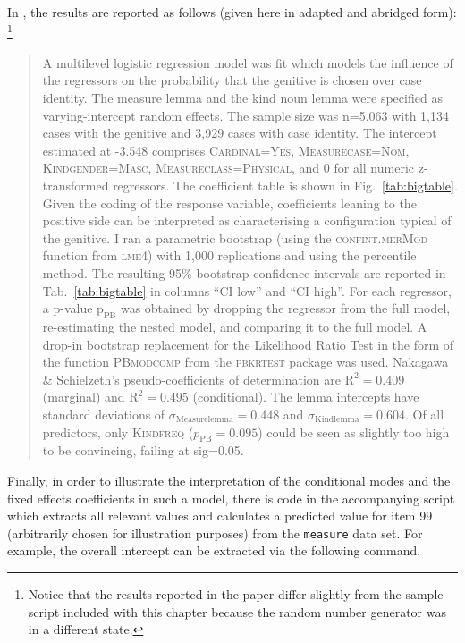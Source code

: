 In \citet{Schaefer2018}, the results are reported as follows (given here in adapted and abridged form):%
\footnote{Notice that the results reported in the paper differ slightly from the sample script included with this chapter because the random number generator was in a different state.}

\begin{quote}
  A multilevel logistic regression model was fit which models the influence of the regressors on the probability that the genitive is chosen over case identity.
  The measure lemma and the kind noun lemma were specified as varying-intercept random effects.
  The sample size was n=5,063 with 1,134 cases with the genitive and 3,929 cases with case identity.
  The intercept estimated at -3.548 comprises \textsc{Cardinal=Yes}, \textsc{Measurecase=Nom}, \textsc{Kindgender=Masc}, \textsc{Measureclass=Physical}, and 0 for all numeric z-transformed regressors.
  The coefficient table is shown in Fig.~\ref{tab:bigtable}.
  Given the coding of the response variable, coefficients leaning to the positive side can be interpreted as characterising a configuration typical of the genitive.
  I ran a parametric bootstrap (using the \mbox{\textsc{confint.merMod}} function from \textsc{lme4}) with 1,000 replications and using the percentile method.
  The resulting 95\% bootstrap confidence intervals are reported in Tab.~\ref{tab:bigtable} in columns ``CI low'' and ``CI high''.
  For each regressor, a p-value $\text{p}_{\text{PB}}$ was obtained by dropping the regressor from the full model, re-estimating the nested model, and comparing it to the full model.
  A drop-in bootstrap replacement for the Likelihood Ratio Test in the form of the function \textsc{PBmodcomp} from the \textsc{pbkrtest} package \citep{HalekohHojsgaard2014} was used. 
  Nakagawa \& Schielzeth's pseudo-coefficients of determination are $\textrm{R}^{\textrm{2}}=0.409$ (marginal) and $\textrm{R}^{\textrm{2}}=0.495$ (conditional).
  The lemma intercepts have standard deviations of $\sigma_{\text{Measurelemma}}=0.448$ and $\sigma_{\text{Kindlemma}}=0.604$.
  Of all predictors, only \textsc{Kindfreq} ($p_{\text{PB}}=0.095$) could be seen as slightly too high to be convincing, failing at sig=0.05.
\end{quote}

Finally, in order to illustrate the interpretation of the conditional modes and the fixed effects coefficients in such a model, there is code in the accompanying script which extracts all relevant values and calculates a predicted value for item 99 (arbitrarily chosen for illustration purposes) from the \texttt{measure} data set.
For example, the overall intercept can be extracted via the following command.

